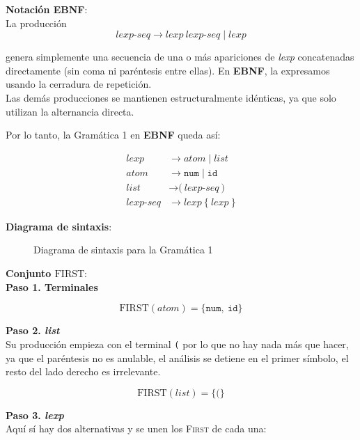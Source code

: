 \documentclass[12pt,letterpaper]{article}
\newcommand{\nt}[1]{\textit{#1}}
\newcommand{\tk}[1]{\texttt{#1}}
\newcommand{\First}[1]{\mathrm{FIRST}(#1)}
\begin{document}
\begin{enumerate}[label=\arabic*.]
\begin{itemize}
    \textbf{\large Notación EBNF}:\\
    La producción
    \[
    \nt{lexp-seq} \rightarrow \nt{lexp}\ \nt{lexp-seq} \mid \nt{lexp}
    \]
    
    genera simplemente una secuencia de una o más apariciones de \nt{lexp} concatenadas directamente
    (sin coma ni paréntesis entre ellas). En \textbf{EBNF}, la expresamos usando la cerradura de repetición.\\
    Las demás producciones se mantienen estructuralmente idénticas, ya que solo utilizan la alternancia
    directa.
    
    Por lo tanto, la Gramática 1 en \textbf{EBNF} queda así:

    \[
    \begin{aligned}
      \nt{lexp} &\rightarrow \nt{atom} \mid \nt{list}\\
      \nt{atom} &\rightarrow \tk{num} \mid \tk{id}\\
      \nt{list} &\rightarrow \tk{(}\ \nt{lexp-seq}\ \tk{)}\\
      \nt{lexp-seq} &\rightarrow \nt{lexp}\ \{\ \nt{lexp}\ \}
    \end{aligned}
    \]

    \newpage
    
    \textbf{\large Diagrama de sintaxis}:\\

    \begin{figure}[ht]
      \centering
      
      \caption{Diagrama de sintaxis para la Gramática 1}
      \label{fig:diagrama_sintaxis}
    \end{figure}

    \newpage
    
    \textbf{\large Conjunto $\mathrm{FIRST}$}:\\

    \textbf{Paso 1. Terminales}
    
    \[
    \First{\nt{atom}} = \{\tk{num},\ \tk{id}\}
    \]
    
    \textbf{Paso 2. \nt{list}}\\
    Su producción empieza con el terminal \tk{(} por lo que no hay nada más que hacer, ya que el paréntesis no es
    anulable, el análisis se detiene en el primer símbolo, el resto del lado derecho es irrelevante.
    
    \[
    \First{\nt{list}} = \{\tk{(}\}
    \]
    
    \textbf{Paso 3. \nt{lexp}}\\
    Aquí sí hay dos alternativas y se unen los \textsc{First} de cada una:
    

\end{itemize}
\end{enumerate}
\end{document}
